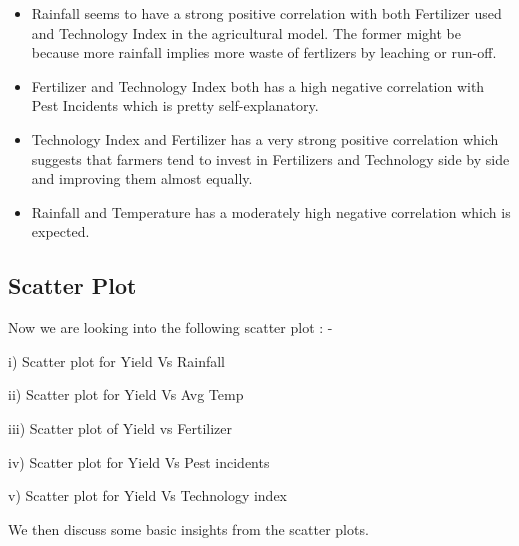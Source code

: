 \vspace{1 mm}
\begin{itemize}
    
\item Rainfall seems to have a strong positive correlation with both Fertilizer used and Technology Index in the agricultural model. The former might be because more rainfall implies more waste of fertlizers by leaching or run-off.

\item Fertilizer and Technology Index both has a high negative correlation with Pest Incidents which is pretty self-explanatory.

\item Technology Index and Fertilizer has a very strong positive correlation which suggests that farmers tend to invest in Fertilizers and Technology side by side and improving them almost equally.

\item Rainfall and Temperature has a moderately high negative correlation which is expected.
\end{itemize}
\subsection{Scatter Plot}

Now we are looking into the following scatter plot : -

\vspace{1 mm}
\hspace{-5 mm}i) Scatter plot for Yield Vs Rainfall

\vspace{1 mm}
\hspace{-5 mm}ii) Scatter plot for Yield Vs Avg Temp

\vspace{1 mm}
\hspace{-5 mm}iii) Scatter plot of Yield vs Fertilizer

\vspace{1 mm}
\hspace{-5 mm}iv) Scatter plot for Yield Vs Pest incidents

\vspace{1 mm}
\hspace{-5 mm}v) Scatter plot for Yield Vs Technology index

\vspace{1 mm}
\hspace{-5 mm}We then discuss some basic insights from the scatter plots.

